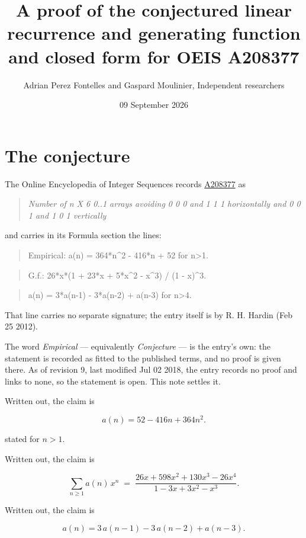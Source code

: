 \documentclass[11pt]{article}
\title{A proof of the conjectured linear recurrence and generating function and closed form for OEIS A208377}
\author{Adrian Perez Fontelles and Gaspard Moulinier, Independent researchers}
\date{09 September 2026}
\theoremstyle{definition}
\begin{document}
\maketitle
\section{The conjecture}

The Online Encyclopedia of Integer Sequences records \href{https://oeis.org/A208377}{A208377} as

\begin{quote}\itshape Number of n X 6 0..1 arrays avoiding 0 0 0 and 1 1 1 horizontally and 0 0 1 and 1 0 1 vertically\end{quote}

and carries in its Formula section the lines:

\begin{quote}\ttfamily Empirical: a(n) = 364*n\textasciicircum{}2 - 416*n + 52 for n>1.\end{quote}

\begin{quote}\ttfamily G.f.: 26*x*(1 + 23*x + 5*x\textasciicircum{}2 - x\textasciicircum{}3) / (1 - x)\textasciicircum{}3.\end{quote}

\begin{quote}\ttfamily a(n) = 3*a(n-1) - 3*a(n-2) + a(n-3) for n>4.\end{quote}

That line carries no separate signature; the entry itself is by R. H. Hardin (Feb 25 2012).

The word {\itshape Empirical} --- equivalently {\itshape Conjecture} --- is the entry's own: the statement is recorded as fitted to the published terms, and no proof is given there. As of revision 9, last modified Jul 02 2018, the entry records no proof and links to none, so the statement is open. This note settles it.

Written out, the claim is

\[a(n) = 52 - 416n + 364n^{2}.\]

stated for $n > 1$.

Written out, the claim is

\[\sum_{n \ge 1} a(n)\,x^n \;=\; \frac{26x + 598x^{2} + 130x^{3} - 26x^{4}}{1 - 3x + 3x^{2} - x^{3}}.\]

Written out, the claim is

\[a(n) = 3\,a(n-1) - 3\,a(n-2) + a(n-3).\]
\end{document}

